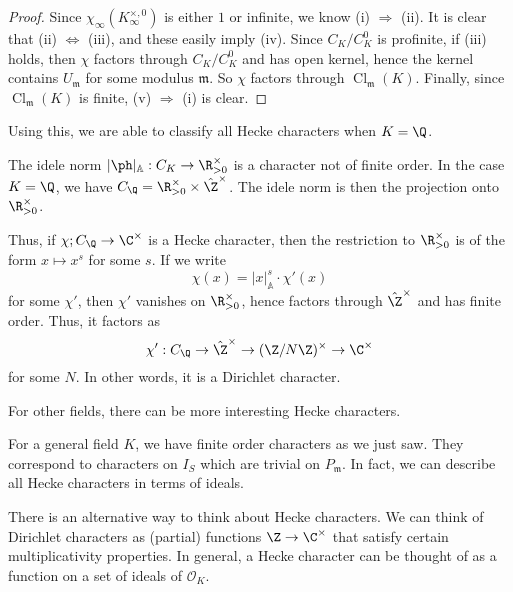 \documentclass[a4paper]{article}
\newcommand\A{\mathbb{A}}
\DeclareMathOperator\Cl{\mathrm{Cl}}
\begin{document}
\begin{proof}
  Since $\chi_\infty(K_\infty^{\times, 0})$ is either $1$ or infinite, we know (i) $\Rightarrow$ (ii). It is clear that (ii) $\Leftrightarrow$ (iii), and these easily imply (iv). Since $C_K/C_K^0$ is profinite, if (iii) holds, then $\chi$ factors through $C_K/C_K^0$ and has open kernel, hence the kernel contains $U_\mathfrak{m}$ for some modulus $\mathfrak{m}$. So $\chi$ factors through $\Cl_{\mathfrak{m}}(K)$. Finally, since $\Cl_{\mathfrak{m}}(K)$ is finite, (v) $\Rightarrow$ (i) is clear.
\end{proof}

Using this, we are able to classify all Hecke characters when $K = \Q$.
\begin{eg}
  The idele norm $|\ph|_{\A}: C_K \to \R^\times_{>0}$ is a character not of finite order. In the case $K = \Q$, we have $C_\Q = \R_{>0}^\times \times \hat{\Z}^\times$. The idele norm is then the projection onto $\R_{>0}^\times$.

  Thus, if $\chi; C_\Q \to \C^\times$ is a Hecke character, then the restriction to $\R_{>0}^\times$ is of the form $x \mapsto x^{s}$ for some $s$. If we write
  \[
    \chi(x) = |x|_{\A}^s \cdot \chi'(x)
  \]
  for some $\chi'$, then $\chi'$ vanishes on $\R_{>0}^\times$, hence factors through $\hat{\Z}^\times$ and has finite order. Thus, it factors as
  \[
    \chi': C_\Q \to \hat{\Z}^\times \to (\Z/N\Z)^\times \to \C^\times
  \]
  for some $N$. In other words, it is a Dirichlet character.
\end{eg}
For other fields, there can be more interesting Hecke characters.

For a general field $K$, we have finite order characters as we just saw. They correspond to characters on $I_S$ which are trivial on $P_\mathfrak{m}$. In fact, we can describe all Hecke characters in terms of ideals.

There is an alternative way to think about Hecke characters. We can think of Dirichlet characters as (partial) functions $\Z \to \C^\times$ that satisfy certain multiplicativity properties. In general, a Hecke character can be thought of as a function on a set of ideals of $\mathcal{O}_K$.
\end{document}
